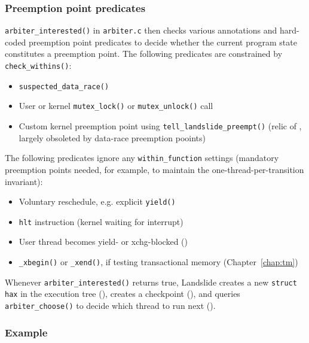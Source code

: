 \subsubsection{Preemption point predicates}

{\tt arbiter\_interested()} in {\tt arbiter.c} then
checks various annotations and hard-coded preemption point predicates
to decide whether the current program state constitutes a preemption point.
The following predicates are constrained by {\tt check\_withins()}:

\begin{itemize}
	\item {\tt suspected\_data\_race()}
	\item User or kernel {\tt mutex\_lock()} or {\tt mutex\_unlock()} call
	\item Custom kernel preemption point using {\tt tell\_landslide\_preempt()}
		(relic of \cite{landslide}, largely obsoleted by data-race preemption pooints)
\end{itemize}

The following predicates ignore any {\tt within\_function} settings
(mandatory preemption points needed, for example, to maintain the one-thread-per-transition invariant):

\begin{itemize}
	\item Voluntary reschedule, e.g. explicit {\tt yield()}
	\item {\tt hlt} instruction (kernel waiting for interrupt)
	\item User thread becomes yield- or xchg-blocked (\sect{\ref{sec:landslide-blocking}})
	\item {\tt \_xbegin()} or {\tt \_xend()}, if testing transactional memory (Chapter~\ref{chap:tm})
\end{itemize}

Whenever {\tt arbiter\_interested()} returns true,
Landslide creates a new {\tt struct hax} in the execution tree (\sect{\ref{sec:landslide-save}}),
creates a checkpoint (\sect{\ref{sec:landslide-timetravel}}),
and queries {\tt arbiter\_choose()} to decide which thread to run next (\sect{\ref{sec:landslide-arbiter}}).

\subsubsection{Example}

